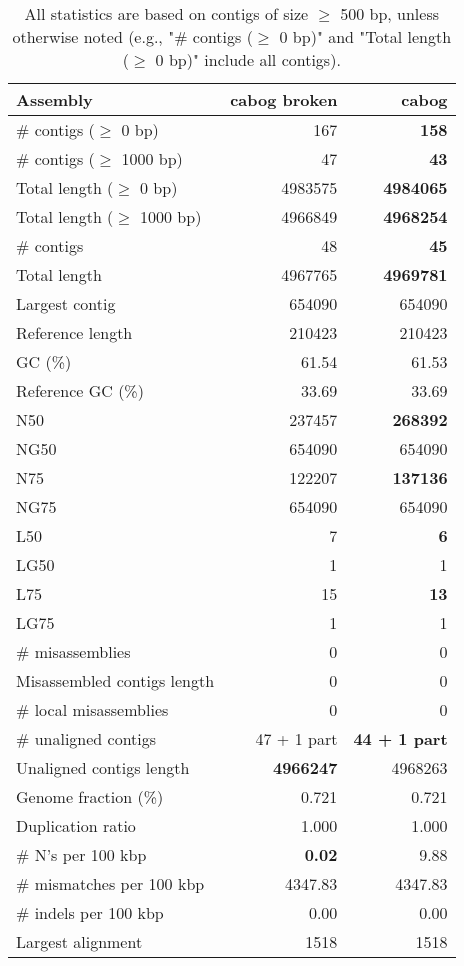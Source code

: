 \documentclass[12pt,a4paper]{article}
\begin{document}
\begin{table}[ht]
\begin{center}
\caption{All statistics are based on contigs of size $\geq$ 500 bp, unless otherwise noted (e.g., "\# contigs ($\geq$ 0 bp)" and "Total length ($\geq$ 0 bp)" include all contigs).}
\begin{tabular}{|l*{2}{|r}|}
\hline
Assembly & cabog broken & cabog \\ \hline
\# contigs ($\geq$ 0 bp) & 167 & {\bf 158} \\ \hline
\# contigs ($\geq$ 1000 bp) & 47 & {\bf 43} \\ \hline
Total length ($\geq$ 0 bp) & 4983575 & {\bf 4984065} \\ \hline
Total length ($\geq$ 1000 bp) & 4966849 & {\bf 4968254} \\ \hline
\# contigs & 48 & {\bf 45} \\ \hline
Total length & 4967765 & {\bf 4969781} \\ \hline
Largest contig & 654090 & 654090 \\ \hline
Reference length & 210423 & 210423 \\ \hline
GC (\%) & 61.54 & 61.53 \\ \hline
Reference GC (\%) & 33.69 & 33.69 \\ \hline
N50 & 237457 & {\bf 268392} \\ \hline
NG50 & 654090 & 654090 \\ \hline
N75 & 122207 & {\bf 137136} \\ \hline
NG75 & 654090 & 654090 \\ \hline
L50 & 7 & {\bf 6} \\ \hline
LG50 & 1 & 1 \\ \hline
L75 & 15 & {\bf 13} \\ \hline
LG75 & 1 & 1 \\ \hline
\# misassemblies & 0 & 0 \\ \hline
Misassembled contigs length & 0 & 0 \\ \hline
\# local misassemblies & 0 & 0 \\ \hline
\# unaligned contigs & 47 + 1 part & {\bf 44 + 1 part} \\ \hline
Unaligned contigs length & {\bf 4966247} & 4968263 \\ \hline
Genome fraction (\%) & 0.721 & 0.721 \\ \hline
Duplication ratio & 1.000 & 1.000 \\ \hline
\# N's per 100 kbp & {\bf 0.02} & 9.88 \\ \hline
\# mismatches per 100 kbp & 4347.83 & 4347.83 \\ \hline
\# indels per 100 kbp & 0.00 & 0.00 \\ \hline
Largest alignment & 1518 & 1518 \\ \hline
\end{tabular}
\end{center}
\end{table}
\end{document}
